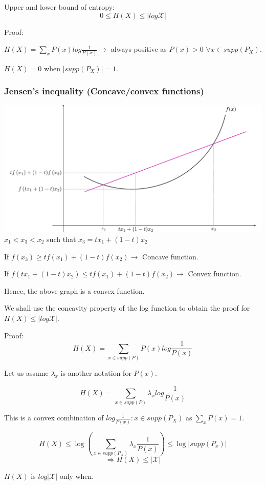 \documentclass{article}
\begin{document}
Upper and lower bound of entropy:
$$ 0 \leq H(X) \leq |log \mathcal X|$$

Proof:

$ H(X)= \sum_x P(x)log \frac{1}{P(x)} \rightarrow $ always positive as $P(x)>0$ $\forall x \in supp(P_X)$.

$H(X)= 0$ when $|supp(P_X)|=1$.

\subsubsection{Jensen's inequality (Concave/convex functions)}

\includegraphics[width=\textwidth]{graph.png}
$x_1 < x_3 <x_2 $ such that $x_3= tx_1+(1-t)x_2$

If $f(x_3) \geq tf(x_1)+(1-t)f(x_2) \rightarrow $ Concave function.

If $f(tx_1+(1-t)x_2) \leq tf(x_1)+(1-t)f(x_2) \rightarrow $ Convex function.

Hence, the above graph is a convex function.

We shall use the concavity property of the log function to obtain the proof for $ H(X) \leq |log \mathcal X| $.

Proof:
$$ H(X)= \sum_{x \in supp(P)} P(x)log\frac{1}{P(x)}$$

Let us assume $\lambda_x$ is another notation for $P(x)$.

$$H(X)= \sum_{x \in supp(P)} \lambda_x log\frac{1}{P(x)}$$

This is a convex combination of $log\frac{1}{P(x)}:x \in supp(P_X)$ as $\sum_{x}P(x)=1$.

$$ H(X) \leq \log \left(\sum_{x \in supp(P_X)}\lambda_x \frac{1}{P(x)} \right) \leq \log |supp(P_x)|$$
$$ \Rightarrow H(X) \leq |\mathcal X |$$

$H(X)$ is $ log|\mathcal X| $ only when.%
\end{document}
